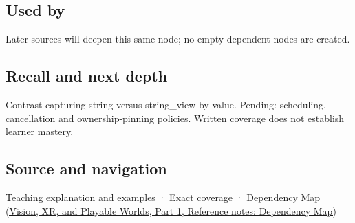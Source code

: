 \subsection{Used by}\label{appendix-aea529eb5175-used-by}

\hypertarget{appendix-aea529eb5175-used-by}{}

Later sources will deepen this same node; no empty dependent nodes are created.

\subsection{Recall and next depth}\label{appendix-aea529eb5175-recall-and-next-depth}

\hypertarget{appendix-aea529eb5175-recall-and-next-depth}{}

Contrast capturing string versus string\_view by value. Pending: scheduling, cancellation and ownership-pinning policies. Written coverage does not establish learner mastery.

\subsection{Source and navigation}\label{appendix-aea529eb5175-source-and-navigation}

\hypertarget{appendix-aea529eb5175-source-and-navigation}{}

\hyperref[01-foundations-i-ch003-borrowed-views-and-deferred-work-need-an-owner-story]{Teaching explanation and examples} · \hyperref[appendix-fd090d982a15-m008---parts-113-126]{Exact coverage} · \href{../07-Vision-XR-and-Playable-Worlds-P01/main.pdf\#appendix-4ad47bdd269a}{Dependency Map (Vision, XR, and Playable Worlds, Part 1, Reference notes: Dependency Map)}
